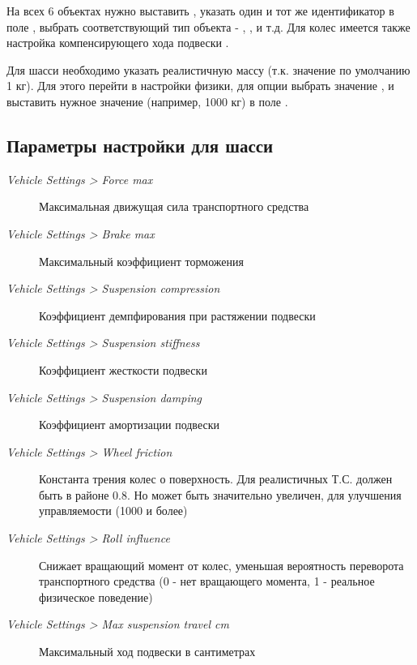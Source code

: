 \documentclass[a4paper,12pt,oneside]{sphinxmanual}
\begin{document}
\begin{DUlineblock}{0em}
\item[] 
\end{DUlineblock}

На всех 6 объектах нужно выставить , указать один и тот же идентификатор в поле , выбрать соответствующий тип объекта - , ,  и т.д. Для колес имеется также настройка компенсирующего хода подвески .

Для шасси необходимо указать реалистичную массу (т.к. значение по умолчанию 1 кг). Для этого перейти в настройки физики, для опции  выбрать значение , и выставить нужное значение (например, 1000 кг) в поле .


\subsection{Параметры настройки для шасси}
\label{physics:id6}\begin{description}
\item[{\emph{Vehicle Settings \textgreater{} Force max}}] \leavevmode
Максимальная движущая сила транспортного средства

\item[{\emph{Vehicle Settings \textgreater{} Brake max}}] \leavevmode
Максимальный коэффициент торможения

\item[{\emph{Vehicle Settings \textgreater{} Suspension compression}}] \leavevmode
Коэффициент демпфирования при растяжении подвески

\item[{\emph{Vehicle Settings \textgreater{} Suspension stiffness}}] \leavevmode
Коэффициент жесткости подвески

\item[{\emph{Vehicle Settings \textgreater{} Suspension damping}}] \leavevmode
Коэффициент амортизации подвески

\item[{\emph{Vehicle Settings \textgreater{} Wheel friction}}] \leavevmode
Константа трения колес о поверхность. Для реалистичных Т.С. должен быть в районе 0.8. Но может быть значительно увеличен, для улучшения управляемости (1000 и более)

\item[{\emph{Vehicle Settings \textgreater{} Roll influence}}] \leavevmode
Снижает вращающий момент от колес, уменьшая вероятность переворота транспортного средства (0 - нет вращающего момента, 1 - реальное физическое поведение)

\item[{\emph{Vehicle Settings \textgreater{} Max suspension travel cm}}] \leavevmode
Максимальный ход подвески в сантиметрах

\end{description}
\end{document}
